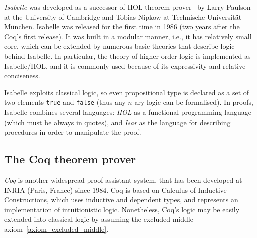 \documentclass[article]{aaltoseries}
\begin{document}
\textit{Isabelle} was developed as a successor of HOL theorem prover~\cite{tool_HOL} by Larry Paulson at the University of Cambridge and Tobias Nipkow at Technische Universität München. Isabelle was released for the first time in 1986 (two years after the Coq's first release). It was built in a modular manner, i.e., it has relatively small core, which can be extended by numerous basic theories that describe logic behind Isabelle. In particular, the theory of higher-order logic is implemented as Isabelle/HOL, and it is commonly used because of its expressivity and relative conciseness. 

Isabelle exploits classical logic, so even propositional type is declared as a set of two elements \texttt{true} and \texttt{false} (thus any $n$-ary logic can be formalised). In proofs, Isabelle combines several languages: \textit{HOL} as a functional programming language (which must be always in quotes), and \textit{Isar} as the language for describing procedures in order to manipulate the proof.



\subsection{The Coq theorem prover}
\label{sec:prover_coq}

\textit{Coq} is another widespread proof assistant system, that has been developed at INRIA (Paris, France) since 1984. Coq is based on Calculus of Inductive Constructions, which uses inductive and dependent types, and represents an implementation of intuitionistic logic. Nonetheless, Coq's logic may be easily extended into classical logic by assuming the excluded middle axiom~\ref{axiom_excluded_middle}.
\end{document}
